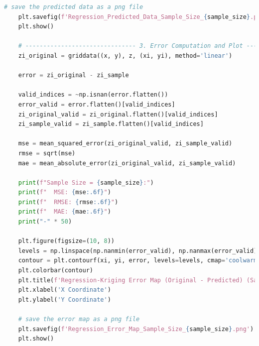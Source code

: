 \documentclass{swmcmthesis}
\begin{document}
\begin{lstlisting}[language=python,caption={The python programme for Problem 3 - Regression Kriging}]
    # save the predicted data as a png file
    plt.savefig(f'Regression_Predicted_Data_Sample_Size_{sample_size}.png')
    plt.show()

    # ------------------------------- 3. Error Computation and Plot ------------------------------- #
    zi_original = griddata((x, y), z, (xi, yi), method='linear')

    error = zi_original - zi_sample

    valid_indices = ~np.isnan(error.flatten()) 
    error_valid = error.flatten()[valid_indices]
    zi_original_valid = zi_original.flatten()[valid_indices]
    zi_sample_valid = zi_sample.flatten()[valid_indices]

    mse = mean_squared_error(zi_original_valid, zi_sample_valid)
    rmse = sqrt(mse)
    mae = mean_absolute_error(zi_original_valid, zi_sample_valid)

    print(f"Sample Size = {sample_size}:")
    print(f"  MSE: {mse:.6f}")
    print(f"  RMSE: {rmse:.6f}")
    print(f"  MAE: {mae:.6f}")
    print("-" * 50)

    plt.figure(figsize=(10, 8))
    levels = np.linspace(np.nanmin(error_valid), np.nanmax(error_valid), 20)
    contour = plt.contourf(xi, yi, error, levels=levels, cmap='coolwarm')  
    plt.colorbar(contour) 
    plt.title(f'Regression-Kriging Error Map (Original - Predicted) (Sample Size = {sample_size})')
    plt.xlabel('X Coordinate')
    plt.ylabel('Y Coordinate')

    # save the error map as a png file
    plt.savefig(f'Regression_Error_Map_Sample_Size_{sample_size}.png')
    plt.show()
 \end{lstlisting}
\end{document}
